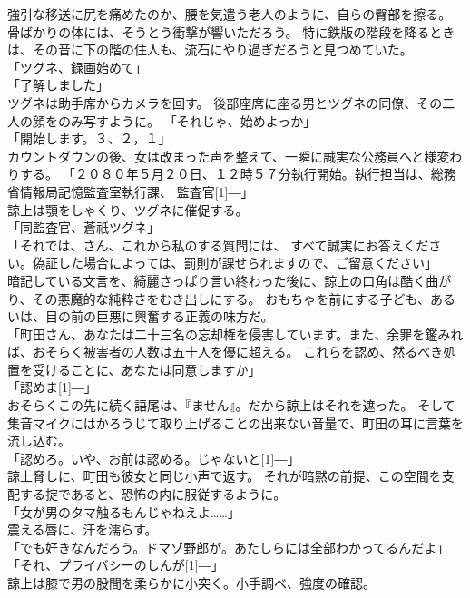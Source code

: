 \documentclass[../NenokuniMain]{subfiles}
\begin{document}
強引な移送に尻を痛めたのか、腰を気遣う老人のように、自らの臀部を擦る。
骨ばかりの体には、そうとう衝撃が響いただろう。
特に鉄版の階段を降るときは、その音に下の階の住人も、流石にやり過ぎだろうと見つめていた。\\
「ツグネ、録画始めて」\\
「了解しました」\\
ツグネは助手席からカメラを回す。
後部座席に座る男とツグネの同僚、その二人の顔をのみ写すように。
「それじゃ、始めよっか」\\
「開始します。３、２，１」\\
カウントダウンの後、女は改まった声を整えて、一瞬に誠実な公務員へと様変わりする。
「２０８０年５月２０日、１２時５７分執行開始。執行担当は、総務省情報局記憶監査室執行課、
監査官\scalebox{2}[1]{―}」\\
諒上は顎をしゃくり、ツグネに催促する。\\
「同監査官、蒼祇ツグネ」\\
「それでは、さん、これから私のする質問には、
すべて誠実にお答えください。偽証した場合によっては、罰則が課せられますので、ご留意ください」\\
暗記している文言を、綺麗さっぱり言い終わった後に、諒上の口角は酷く曲がり、その悪魔的な純粋さをむき出しにする。
おもちゃを前にする子ども、あるいは、目の前の巨悪に興奮する正義の味方だ。\\
「町田さん、あなたは二十三名の忘却権を侵害しています。また、余罪を鑑みれば、おそらく被害者の人数は五十人を優に超える。
これらを認め、然るべき処置を受けることに、あなたは同意しますか」\\
「認めま\scalebox{2}[1]{―}」\\
おそらくこの先に続く語尾は、『ません』。だから諒上はそれを遮った。
そして集音マイクにはかろうじて取り上げることの出来ない音量で、町田の耳に言葉を流し込む。\\
「認めろ。いや、お前は認める。じゃないと\scalebox{2}[1]{―}」\\
諒上脅しに、町田も彼女と同じ小声で返す。
それが暗黙の前提、この空間を支配する掟であると、恐怖の内に服従するように。\\
「女が男のタマ触るもんじゃねえよ……」\\
震える唇に、汗を濡らす。\\
「でも好きなんだろう。ドマゾ野郎が。あたしらには全部わかってるんだよ」\\
「それ、プライバシーのしんが\scalebox{2}[1]{―}」\\
諒上は膝で男の股間を柔らかに小突く。小手調べ、強度の確認。
\end{document}
